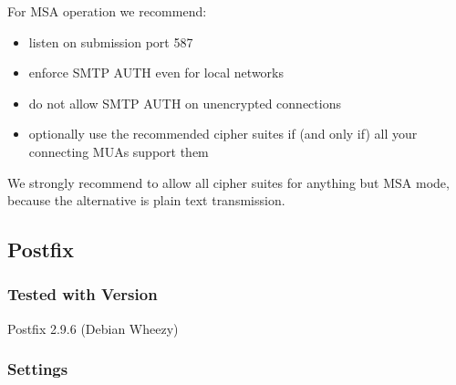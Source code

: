 For MSA operation we recommend:
\begin{itemize}
\item listen on submission port 587
\item enforce SMTP AUTH even for local networks
\item do not allow SMTP AUTH on unencrypted connections
\item optionally use the recommended cipher suites if (and only if) all your connecting MUAs support them
\end{itemize}




We strongly recommend to allow all cipher suites for anything but MSA
mode, because the alternative is plain text transmission.


\subsection{Postfix}

\subsubsection{Tested with Version} Postfix 2.9.6 (Debian Wheezy)
\subsubsection{Settings}


